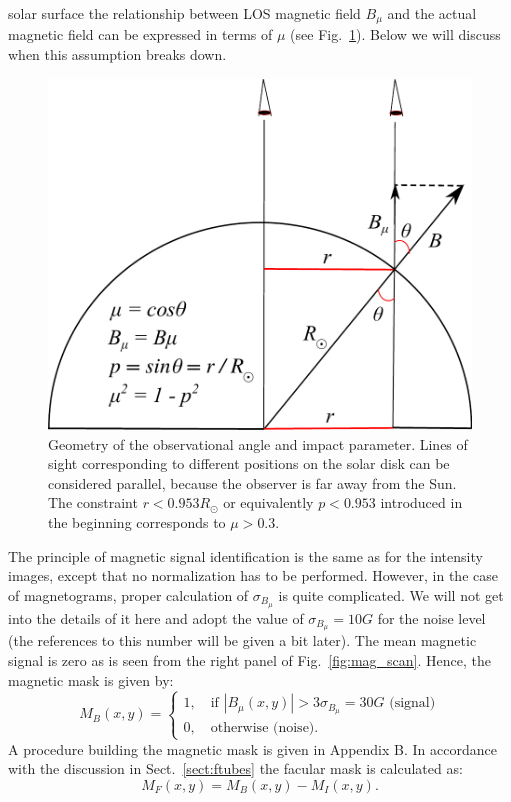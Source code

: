 \documentclass[paper=a4, fontsize=11pt]{article}
\numberwithin{equation}{section}
\numberwithin{figure}{section}
\numberwithin{table}{section}
\begin{document}
solar surface the relationship between LOS magnetic field $B_\mu$ and
the actual magnetic field can be expressed in terms of $\mu$ (see Fig.~\ref{fig:mu}).
Below we will discuss when this assumption breaks down.
\begin{figure}[h!]
\centering
\includegraphics[scale = 0.865]{mu}
\caption[]{Geometry of the observational angle and impact parameter.
           Lines of sight corresponding to different positions on the solar disk
           can be considered parallel, because the observer is far away from the Sun.
           The constraint $r < 0.953R_\odot$ or equivalently $p < 0.953$ introduced in the beginning
           corresponds to $\mu > 0.3$.
           }
\label{fig:mu}
\end{figure}

The principle of magnetic signal identification is the same as for the intensity images,
except that no normalization has to be performed.
However, in the case of magnetograms, proper calculation of $\sigma_{B_\mu}$ is quite complicated.
We will not get into the details of it here and adopt the value of $\sigma_{B_\mu} = 10G$ for the noise level
(the references to this number will be given a bit later).
The mean magnetic signal is zero as is seen from the right panel of Fig.~\ref{fig:mag_scan}.
Hence, the magnetic mask is given by:
\begin{equation}\label{eq:mag_mask}
M_B(x, y) =
\begin{cases}
1,\quad \text{if } |B_\mu(x, y)| > 3\sigma_{B_\mu} = 30G\text{ (signal)}\\
0,\quad \text{otherwise (noise)}.
\end{cases}
\end{equation}
A procedure building the magnetic mask is given in Appendix B.
In accordance with the discussion in Sect.~\ref{sect:ftubes} the facular mask is calculated as:
\begin{equation}\label{eq:fac_mask}
M_F(x, y) = M_B(x, y) - M_I(x, y).
\end{equation}
\end{document}
